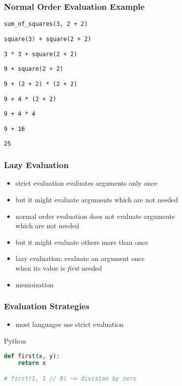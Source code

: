\documentclass[dvipsnames]{beamer}
\theoremstyle{plain}
\begin{document}
\begin{frame}
  \frametitle{Normal Order Evaluation Example}

  \begin{exampleblock}{}
    \lstinline|sum_of_squares(3, 2 + 2)|

    \pause
    \medskip
    \lstinline|square(3) + square(2 + 2)|

    \pause
    \medskip
    \lstinline|3 * 3 + square(2 + 2)|

    \pause
    \medskip
    \lstinline|9 + square(2 + 2)|

    \pause
    \medskip
    \lstinline|9 + (2 + 2) * (2 + 2)|

    \pause
    \medskip
    \lstinline|9 + 4 * (2 + 2)|

    \pause
    \medskip
    \lstinline|9 + 4 * 4|

    \pause
    \medskip
    \lstinline|9 + 16|

    \pause
    \medskip
    \lstinline|25|
  \end{exampleblock}
\end{frame}

\begin{frame}
  \frametitle{Lazy Evaluation}

  \begin{itemize}
    \item strict evaluation evaluates arguments only once
    \item but it might evaluate arguments which are not needed

    \medskip
    \item normal order evaluation does not evaluate arguments\\
      which are not needed
    \item but it might evaluate others more than once

    \pause
    \medskip
    \item \alert{lazy evaluation}: evaluate an argument once\\
      when its value is \emph{first} needed
    \item \alert{memoization}
  \end{itemize}
\end{frame}

\begin{frame}[fragile]
  \frametitle{Evaluation Strategies}

  \begin{itemize}
    \item most languages use strict evaluation
  \end{itemize}

  \begin{exampleblock}{Python}
    \begin{lstlisting}[language=Python]
def first(x, y):
    return x

# first(1, 1 // 0) ~> division by zero
    \end{lstlisting}
  \end{exampleblock}
\end{frame}
\end{document}
